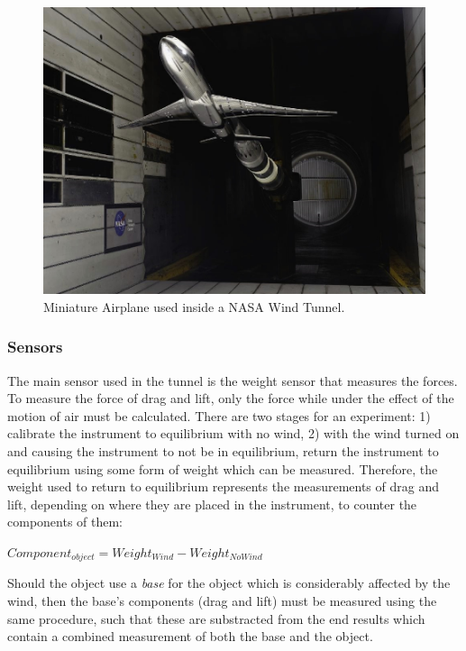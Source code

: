 		\begin{figure}[H]
			\centering
				\includegraphics[scale=0.225]{img/nasaAirplaneWT}
			\caption{Miniature Airplane used inside a NASA Wind Tunnel. \cite{ref:wright5}}
		\end{figure}
	
	\subsubsection{Sensors}
	
	The main sensor used in the tunnel is the weight sensor that measures the forces. To measure the force of drag and lift, only the force while under the effect of the motion of air must be calculated. There are two stages for an experiment: 1) calibrate the instrument to equilibrium with no wind, 2) with the wind turned on and causing the instrument to not be in equilibrium, return the instrument to equilibrium using some form of weight which can be measured. Therefore, the weight used to return to equilibrium represents the measurements of drag and lift, depending on where they are placed in the instrument, to counter the components of them:

	$Component_{object} = Weight_{Wind} - Weight_{NoWind} $


	Should the object use a \emph{base} for the object which is considerably affected by the wind, then the base's components (drag and lift) must be measured using the same procedure, such that these are substracted from the end results which contain a combined measurement of both the base and the object. 

